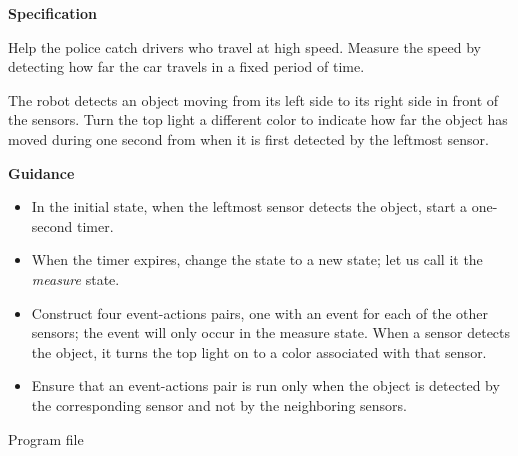 \label{ch.radar}

\textbf{Specification}

Help the police catch drivers who travel at high speed. Measure the
speed by detecting how far the car travels in a fixed period of time.

The robot detects an object moving from its left side to its right side
in front of the sensors. Turn the top light a different color to
indicate how far the object has moved during one second from when it is
first detected by the leftmost sensor.

\textbf{Guidance}

\begin{itemize}

\item In the initial state, when the leftmost sensor detects the object,
start a one-second timer.

\item When the timer expires, change the state to a new state; let us
call it the \emph{measure} state.

\item Construct four event-actions pairs, one with an event for each of
the other sensors; the event will only occur in the measure state. When
a sensor detects the object, it turns the top light on to a color
associated with that sensor.

\item Ensure that an event-actions pair is run only when the object is
detected by the corresponding sensor and not by the neighboring sensors.

\end{itemize}

\bigskip

{\raggedleft \hfill Program file }
